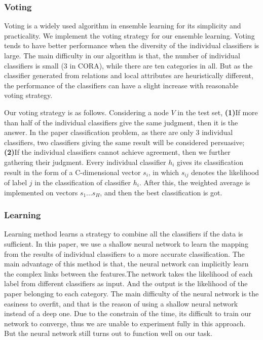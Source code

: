 \documentclass{sig-alternate}
\begin{document}
\subsubsection{Voting}
Voting is a widely used algorithm in ensemble learning for its simplicity and practicality. We implement the voting strategy for our ensemble learning. Voting tends to have better performance when the diversity of the individual classifiers is large. The main difficulty in our algorithm is that, the number of individual classifiers is small (3 in CORA), while there are ten categories in all. But as the classifier generated from relations and local attributes are heuristically different, the performance of the classifiers can have a slight increase with reasonable voting strategy.

Our voting strategy is as follows. Considering a node $V$ in the test set, \textbf{(1)}If more than half of the individual classifiers give the same judgment, then it is the answer. In the paper classification problem, as there are only 3 individual classifiers, two classifiers giving the same result will be considered persuasive; \textbf{(2)}If the individual classifiers cannot achieve agreement, then we further gathering their judgment. Every individual classifier $h_{i}$ gives its classification result in the form of a C-dimensional vector $s_{i}$, in which $s_{ij}$ denotes the likelihood of label $j$ in the classification of classifier $h_{i}$. After this, the weighted average is implemented on vectors $s_{1}...s_{H}$, and then the best classification is got.  

\subsubsection{Learning}
Learning method learns a strategy to combine all the classifiers if the data is sufficient. In this paper, we use a shallow neural network to learn the mapping from the results of individual classifiers to a more accurate classification. The main advantage of this method is that, the neural network can implicitly learn the complex links between the features.The network takes the likelihood of each label from different classifiers as input. And the output is the likelihood of the paper belonging to each category. The main difficulty of the neural network is the easiness to overfit, and that is the reason of using a shallow neural network instead of a deep one. Due to the constrain of the time, its difficult to train our network to converge, thus we are unable to experiment fully in this approach. But the neural network still turns out to function well on our task.
\end{document}
